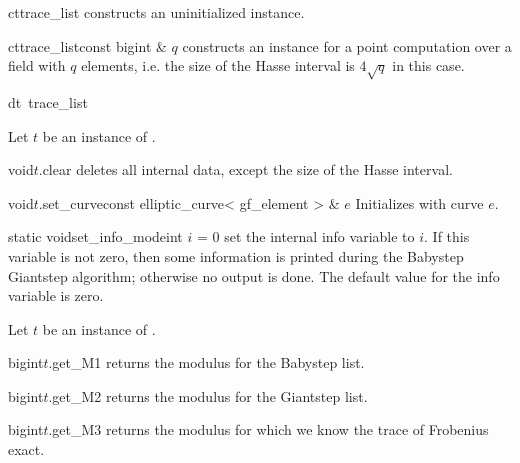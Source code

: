 \CONS

\begin{fcode}{ct}{trace_list}{}
  constructs an uninitialized instance.
\end{fcode}

\begin{fcode}{ct}{trace_list}{const bigint & $q$}
  constructs an instance for a point computation over a field with $q$ elements, i.e. the size
  of the Hasse interval is $4 \sqrt{q}$ in this case.
\end{fcode}

\begin{fcode}{dt}{~trace_list}{}
\end{fcode}



\ASGN

Let $t$ be an instance of .

\begin{fcode}{void}{$t$.clear}{}
  deletes all internal data, except the size of the Hasse interval.
\end{fcode}

\begin{fcode}{void}{$t$.set_curve}{const elliptic_curve< gf_element > & $e$}
  Initializes with curve $e$.
\end{fcode}

\begin{fcode}{static void}{set_info_mode}{int $i$ = 0}
  set the internal info variable to $i$.  If this variable is not zero, then some information is
  printed during the Babystep Giantstep algorithm; otherwise no output is done.  The default
  value for the info variable is zero.
\end{fcode}



\ACCS

Let $t$ be an instance of .

\begin{cfcode}{bigint}{$t$.get_M1}{}
  returns the modulus for the Babystep list.
\end{cfcode}

\begin{cfcode}{bigint}{$t$.get_M2}{}
  returns the modulus for the Giantstep list.
\end{cfcode}

\begin{cfcode}{bigint}{$t$.get_M3}{}
  returns the modulus for which we know the trace of Frobenius exact.
\end{cfcode}

